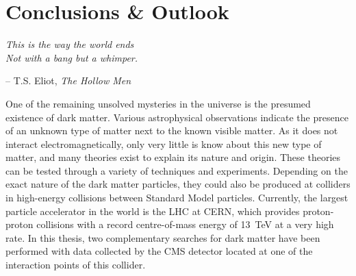 \graphicspath{{chapt_dutch/}{intro/}{conclusions/}}

\renewcommand\evenpagerightmark{{\scshape\small Chapter 7}}
\renewcommand\oddpageleftmark{{\scshape\small Conclusions \& Outlook}}

\hyphenation{}

\chapter{Conclusions \& Outlook}

\begin{flushleft} 
\textit{This is the way the world ends\\
Not with a bang but a whimper.}
\end{flushleft}
\begin{flushright}
-- T.S. Eliot, \textit{The Hollow Men}
\end{flushright}

One of the remaining unsolved mysteries in the universe is the presumed existence of dark matter. Various astrophysical observations indicate the presence of an unknown type of matter next to the known visible matter. As it does not interact electromagnetically, only very little is know about this new type of matter, and many theories exist to explain its nature and origin. These theories can be tested through a variety of techniques and experiments. Depending on the exact nature of the dark matter particles, they could also be produced at colliders in high-energy collisions between Standard Model particles. Currently, the largest particle accelerator in the world is the \ac{LHC} at \ac{CERN}, which provides proton-proton collisions with a record centre-of-mass energy of \SI{13}{TeV} at a very high rate. In this thesis, two complementary searches for dark matter have been performed with data collected by the \ac{CMS} detector located at one of the interaction points of this collider.


